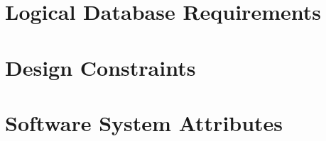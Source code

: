 \documentclass{scrreprt}
\begin{document}
\section{Logical Database Requirements}


\section{Design Constraints}


\section{Software System Attributes}
\end{document}
